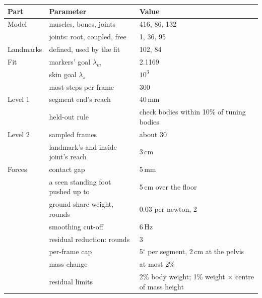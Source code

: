 \documentclass[11pt]{article}
\newcommand{\dg}{\ensuremath{^\circ}}
\begin{document}
\begin{center}\small
{}
\begin{tabular}{@{}lll@{}}
\toprule
Part & Parameter & Value \\
\midrule
Model & muscles, bones, joints & 416, 86, 132 \\
 & joints: root, coupled, free & 1, 36, 95 \\
Landmarks & defined, used by the fit & 102, 84 \\
Fit & markers' goal $\lambda_m$ & 2.1169 \\
 & skin goal $\lambda_s$ & $10^3$ \\
 & most steps per frame & 300 \\
Level 1 & segment end's reach & 40\,mm \\
 & held-out rule & check bodies within 10\% of tuning bodies \\
Level 2 & sampled frames & about 30 \\
 & landmark's and inside joint's reach & 3\,cm \\
Forces & contact gap & 5\,mm \\
 & a seen standing foot pushed up to & 5\,cm over the floor \\
 & ground share weight, rounds & 0.03 per newton, 2 \\
 & smoothing cut-off & 6\,Hz \\
 & residual reduction: rounds & 3 \\
 & \quad per-frame cap & 5\dg{} per segment, 2\,cm at the pelvis \\
 & \quad mass change & at most 2\% \\
 & residual limits & 2\% body weight; 1\% weight $\times$ centre of mass height \\
\bottomrule
\end{tabular}
\end{center}
\end{document}
